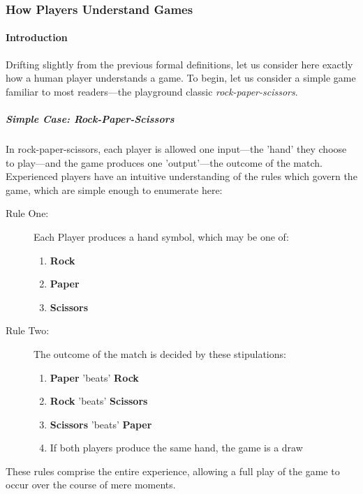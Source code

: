 \documentclass{report}
\newcommand{\state}[1]{\textbf{#1}}
\begin{document}
\subsubsection{How Players Understand Games}

\paragraph{Introduction}

Drifting slightly from the previous formal definitions, let us consider here exactly how a human player understands a game. To begin, let us consider a simple game familiar to most readers---the playground classic \emph{rock-paper-scissors}. 

\subparagraph{Simple Case: \emph{Rock-Paper-Scissors}}

In rock-paper-scissors, each player is allowed one input---the 'hand' they choose to play---and the game produces one 'output'---the outcome of the match. Experienced players have an intuitive understanding of the rules which govern the game, which are simple enough to enumerate here:

\begin{description}
    \item [Rule One:] Each Player produces a hand symbol, which may be one of:
        \begin{enumerate}
            \item \state{Rock}
            \item \state{Paper}
            \item \state{Scissors}
        \end{enumerate}
    \item [Rule Two:] The outcome of the match is decided by these stipulations:
        \begin{enumerate}
            \item \state{Paper} 'beats' \state{Rock}
            \item \state{Rock} 'beats' \state{Scissors}
            \item \state{Scissors} 'beats' \state{Paper}
            \item If both players produce the same hand, the game is a draw
        \end{enumerate}
\end{description}

These rules comprise the entire experience, allowing a full play of the game to occur over the course of mere moments.
\end{document}
